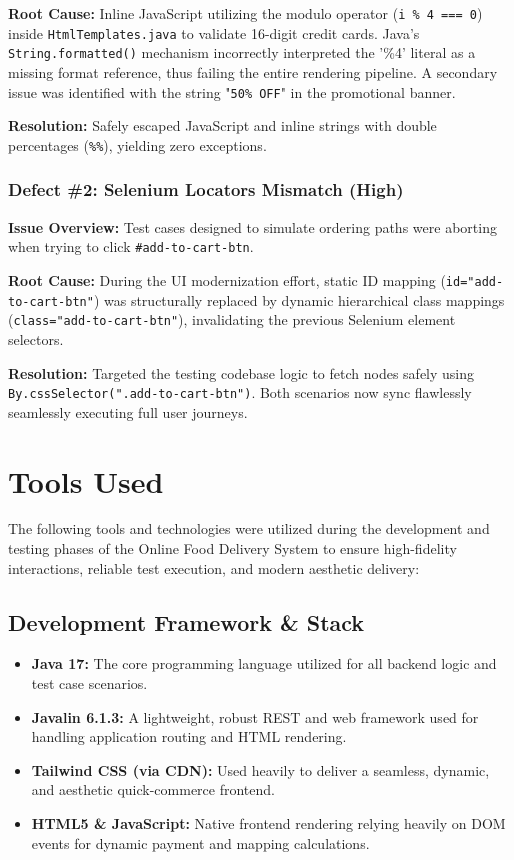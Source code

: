\documentclass[12pt,a4paper]{report}
\begin{document}
\textbf{Root Cause:} 
Inline JavaScript utilizing the modulo operator (\texttt{i \% 4 === 0}) inside \texttt{HtmlTemplates.java} to validate 16-digit credit cards. Java's \texttt{String.formatted()} mechanism incorrectly interpreted the '\%4' literal as a missing format reference, thus failing the entire rendering pipeline. A secondary issue was identified with the string "\texttt{50\% OFF}" in the promotional banner.

\textbf{Resolution:} 
Safely escaped JavaScript and inline strings with double percentages (\texttt{\%\%}), yielding zero exceptions.

\subsection{Defect \#2: Selenium Locators Mismatch (High)}
\textbf{Issue Overview:} 
Test cases designed to simulate ordering paths were aborting when trying to click \texttt{\#add-to-cart-btn}.

\textbf{Root Cause:} 
During the UI modernization effort, static ID mapping (\texttt{id="add-to-cart-btn"}) was structurally replaced by dynamic hierarchical class mappings (\texttt{class="add-to-cart-btn"}), invalidating the previous Selenium element selectors.

\textbf{Resolution:} 
Targeted the testing codebase logic to fetch nodes safely using \texttt{By.cssSelector(".add-to-cart-btn")}. Both scenarios now sync flawlessly seamlessly executing full user journeys.

\chapter{Tools Used}

The following tools and technologies were utilized during the development and testing phases of the Online Food Delivery System to ensure high-fidelity interactions, reliable test execution, and modern aesthetic delivery:

\section{Development Framework \& Stack}
\begin{itemize}
    \item \textbf{Java 17:} The core programming language utilized for all backend logic and test case scenarios.
    \item \textbf{Javalin 6.1.3:} A lightweight, robust REST and web framework used for handling application routing and HTML rendering.
    \item \textbf{Tailwind CSS (via CDN):} Used heavily to deliver a seamless, dynamic, and aesthetic quick-commerce frontend.
    \item \textbf{HTML5 \& JavaScript:} Native frontend rendering relying heavily on DOM events for dynamic payment and mapping calculations.
\end{itemize}
\end{document}
